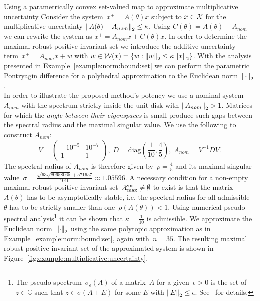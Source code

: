 \begin{example}{Using a parametrically convex set-valued map to approximate multiplicative uncertainty}\label{example:multiplicative:uncertainty}
%
Consider the system~$x^+ = A(\theta)x$ subject to $x\in\mathcal X$ for the multiplicative uncertainty $\left\|A(\theta)-A_{nom}\right\|_2\leq\kappa$.
%
Using $C(\theta) = A(\theta)-A_{nom}$ we can rewrite the system as $x^+ = A_{nom}x+C(\theta)x$.
%
In order to determine the maximal robust positive invariant set we introduce the additive uncertainty term~$x^+ = A_{nom}x+w$ with $w\in\mathcal W(x) = \{w: \left\|w\right\|_2\leq\kappa\left\|x\right\|_2 \}$.
%
With the analysis presented in Example~\ref{example:norm:bound:set} we can perform the parametric Pontryagin difference for a polyhedral approximation to the Euclidean norm~$\left\|\cdot\right\|_2$.
%
\\[1em]
%
In order to illustrate the proposed method's potency we use a nominal system~$A_{nom}$ with the spectrum strictly inside the unit disk with $\left\|A_{nom}\right\|_2>1$. 
%
Matrices for which the \emph{angle between their eigenspaces} is small produce such gaps between the spectral radius and the maximal singular value.
%
We use the following to construct $A_{nom}$:
%
\[
	V = \begin{pmatrix}-10^{-5} & 10^{-7}\\1 & 1\end{pmatrix},\; D = \text{diag}\left(\frac{1}{10},\frac{4}{5}\right),\; A_{nom} = V^{-1}DV.
\]
%
The spectral radius of $A_{nom}$ is therefore given by~$\rho = \frac{4}{5}$ and its maximal singular value~$\bar\sigma = \frac{\sqrt{63 \sqrt{80658065}+571657}}{1010}\approx1.05596$.
%
A necessary condition for a non-empty maximal robust positive invariant set~$\mathcal X^\infty_{\max}\neq\emptyset$ to exist is that the matrix~$A(\theta)$ has to be asymptotically stable, i.e. the spectral radius for all admissible~$\theta$ has to be strictly smaller than one~$\rho(A(\theta))<1$.
%
Using numerical pseudo-spectral analysis\footnote{The pseudo-spectrum~$\sigma_\epsilon(A)$ of a matrix~$A$ for a given~$\epsilon>0$ is the set of $z\in\mathbb C$ such that $z\in\sigma(A+E)$ for some $E$ with $\left\|E\right\|_2\leq\epsilon$.
%
See~\cite{Trefethen:2005} for details.}
%
it can be shown that $\kappa = \frac{1}{10}$ is admissible.
%
We approximate the Euclidean norm~$\left\|\cdot\right\|_2$ using the same polytopic approximation as in Example~\ref{example:norm:bound:set}, again with~$n=35$.
%
The resulting maximal robust positive invariant set of the approximated system is shown in Figure~\ref{fig:example:multiplicative:uncertainty}.
%

\end{example}
